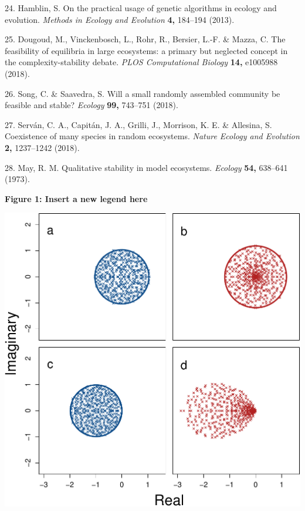\documentclass[]{article}
\begin{document}
\hypertarget{ref-Hamblin2013}{}
24. Hamblin, S. On the practical usage of genetic algorithms in ecology
and evolution. \emph{Methods in Ecology and Evolution} \textbf{4,}
184--194 (2013).

\hypertarget{ref-Dougoud2018}{}
25. Dougoud, M., Vinckenbosch, L., Rohr, R., Bersier, L.-F. \& Mazza, C.
The feasibility of equilibria in large ecosystems: a primary but
neglected concept in the complexity-stability debate. \emph{PLOS
Computational Biology} \textbf{14,} e1005988 (2018).

\hypertarget{ref-Song2018}{}
26. Song, C. \& Saavedra, S. Will a small randomly assembled community
be feasible and stable? \emph{Ecology} \textbf{99,} 743--751 (2018).

\hypertarget{ref-Servan2018}{}
27. Serván, C. A., Capitán, J. A., Grilli, J., Morrison, K. E. \&
Allesina, S. Coexistence of many species in random ecosystems.
\emph{Nature Ecology and Evolution} \textbf{2,} 1237--1242 (2018).

\hypertarget{ref-May1973}{}
28. May, R. M. Qualitative stability in model ecosystems. \emph{Ecology}
\textbf{54,} 638--641 (1973).

\clearpage

\textbf{Figure 1: Insert a new legend here}

\includegraphics{ms_files/figure-latex/unnamed-chunk-8-1.pdf}
\end{document}
